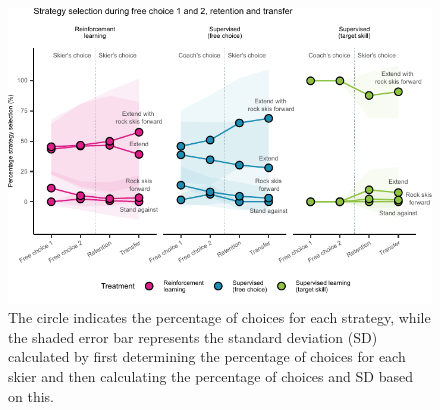 \documentclass[pdflatex,sn-nature]{sn-jnl}%
\theoremstyle{thmstyleone}%
\theoremstyle{thmstyletwo}%
\theoremstyle{thmstylethree}%
\begin{document}
\begin{figure}[H]
\centering
\includegraphics{figures/figure_choice_descriptivecount_4.pdf}
\caption{The circle indicates the percentage of choices for each strategy, while the shaded error bar represents the standard deviation (SD) calculated by first determining the percentage of choices for each skier and then calculating the percentage of choices and SD based on this.}\label{fig: choice_descriptives}
\end{figure}
\end{document}
